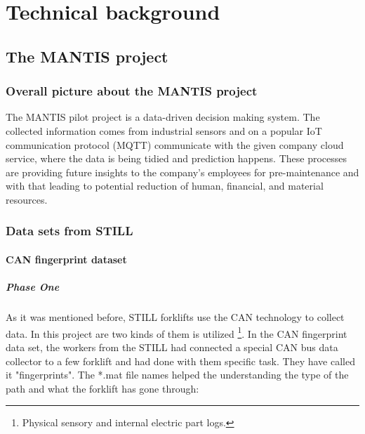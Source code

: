 \chapter{Technical background}
	\section{The MANTIS project}
		\subsection{Overall picture about the MANTIS project}
The MANTIS pilot project is a data-driven decision making system. The collected information comes from industrial sensors and on a popular IoT communication protocol (MQTT) communicate with the given company cloud service, where the data is being tidied and prediction happens. These processes are providing future insights to the company's employees for pre-maintenance and with that leading to potential reduction of human, financial, and material resources.\cite{Mantis}

		\subsection{Data sets from STILL}
			\subsubsection{CAN fingerprint dataset}
				\paragraph{Phase One}
				\noindent
As it was mentioned before, STILL forklifts use the CAN technology to collect data. In this project are two kinds of them is utilized \footnote{Physical sensory and internal electric part logs.}. In the CAN fingerprint data set, the workers from the STILL had connected a special CAN bus data collector to a few forklift and had done with them specific task. They have called it "fingerprints". The *.mat file names helped the understanding the type of the path and what the forklift has gone through:

